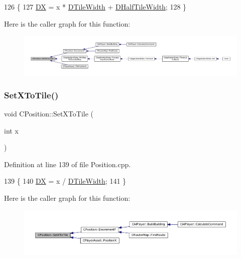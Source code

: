 \begin{DoxyCode}
126                                  \{
127     \hyperlink{classCPosition_a28445f9b872169715919074d82044eda}{DX} = x * \hyperlink{classCPosition_ac17d12fb5d35fcf62d63bb42e8cf7ed6}{DTileWidth} + \hyperlink{classCPosition_a3227e835d9008346e9d91bdad2380f14}{DHalfTileWidth};
128 \}
\end{DoxyCode}
Here is the caller graph for this function\+:
\nopagebreak
\begin{figure}[H]
\begin{center}
\leavevmode
\includegraphics[width=350pt]{classCPosition_ac6a1eeaeb98e20942efea7cf253b2ec4_icgraph}
\end{center}
\end{figure}
\hypertarget{classCPosition_a12795d06d34e608697b7b4c9bf202a10}{}\label{classCPosition_a12795d06d34e608697b7b4c9bf202a10} 
\subsubsection{\texorpdfstring{Set\+X\+To\+Tile()}{SetXToTile()}}
{\footnotesize\ttfamily void C\+Position\+::\+Set\+X\+To\+Tile (\begin{DoxyParamCaption}\item[{int}]{x }\end{DoxyParamCaption})}



Definition at line 139 of file Position.\+cpp.


\begin{DoxyCode}
139                                \{
140     \hyperlink{classCPosition_a28445f9b872169715919074d82044eda}{DX} = x / \hyperlink{classCPosition_ac17d12fb5d35fcf62d63bb42e8cf7ed6}{DTileWidth};
141 \}
\end{DoxyCode}
Here is the caller graph for this function\+:
\nopagebreak
\begin{figure}[H]
\begin{center}
\leavevmode
\includegraphics[width=350pt]{classCPosition_a12795d06d34e608697b7b4c9bf202a10_icgraph}
\end{center}
\end{figure}
\hypertarget{classCPosition_a4be1caa5ce58297e9d371f6bc1db32d9}{}\label{classCPosition_a4be1caa5ce58297e9d371f6bc1db32d9} 
